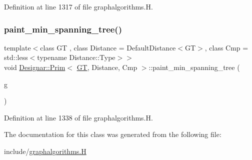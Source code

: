 Definition at line 1317 of file graphalgorithms.\+H.

\mbox{\label{class_designar_1_1_prim_a34cd263d3ccef0be04a710bde8d6aa68}} 
\subsubsection{\texorpdfstring{paint\+\_\+min\+\_\+spanning\+\_\+tree()}{paint\_min\_spanning\_tree()}\hspace{0.1cm}{\footnotesize\ttfamily [2/2]}}
{\footnotesize\ttfamily template$<$class GT , class Distance  = Default\+Distance$<$\+G\+T$>$, class Cmp  = std\+::less$<$typename Distance\+::\+Type$>$$>$ \\
void \hyperlink{class_designar_1_1_prim}{Designar\+::\+Prim}$<$ \hyperlink{demo-buildgraph_8_c_a3001c40d2c31ca87ed96cd7d1334a55e}{GT}, Distance, Cmp $>$\+::paint\+\_\+min\+\_\+spanning\+\_\+tree (\begin{DoxyParamCaption}\item[{\hyperlink{demo-buildgraph_8_c_a3001c40d2c31ca87ed96cd7d1334a55e}{GT} \&}]{g }\end{DoxyParamCaption})\hspace{0.3cm}{\ttfamily [inline]}}



Definition at line 1338 of file graphalgorithms.\+H.



The documentation for this class was generated from the following file\+:\begin{DoxyCompactItemize}
\item 
include/\hyperlink{graphalgorithms_8_h}{graphalgorithms.\+H}\end{DoxyCompactItemize}
